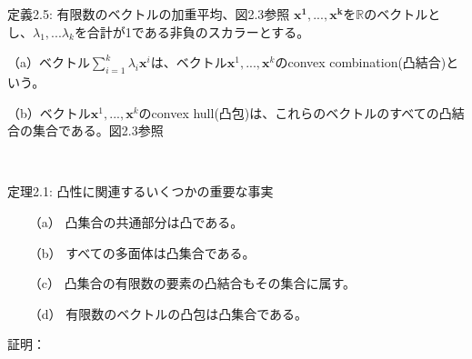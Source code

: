 \documentclass{jsarticle}
\begin{document}
\begin{itembox}[l]{定義2.5: 有限数のベクトルの加重平均、図2.3参照}
$\bm{x^1,...,x^k}$を$\mathbb{R}$のベクトルとし、$\lambda_1,...\lambda_k$を合計が1である非負のスカラーとする。  \par
（a）ベクトル$\sum_{i=1}^k\lambda_i\bm{x}^i$は、ベクトル$\bm{x}^1,...,\bm{x}^k$のconvex combination(凸結合)という。\par
（b）ベクトル$\bm{x}^1,...,\bm{x}^k$のconvex hull(凸包)は、これらのベクトルのすべての凸結合の集合である。図2.3参照
\end{itembox}
 \\
\begin{itembox}[l]{定理2.1: 凸性に関連するいくつかの重要な事実}
\begin{itemize}
\item[（a）]凸集合の共通部分は凸である。\par
\item[（b）]すべての多面体は凸集合である。\par
\item[（c）]凸集合の有限数の要素の凸結合もその集合に属す。\par
\item[（d）]有限数のベクトルの凸包は凸集合である。
\end{itemize}
\end{itembox}
証明：
\end{document}
